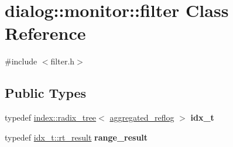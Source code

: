 \hypertarget{classdialog_1_1monitor_1_1filter}{}\section{dialog\+:\+:monitor\+:\+:filter Class Reference}
\label{classdialog_1_1monitor_1_1filter}


{\ttfamily \#include $<$filter.\+h$>$}

\subsection*{Public Types}
\begin{DoxyCompactItemize}
\item 
\mbox{\label{classdialog_1_1monitor_1_1filter_ab7625fee3176adc27d81874ef07e286c}} 
typedef \hyperlink{classdialog_1_1index_1_1radix__tree}{index\+::radix\+\_\+tree}$<$ \hyperlink{classdialog_1_1aggregated__reflog}{aggregated\+\_\+reflog} $>$ {\bfseries idx\+\_\+t}
\item 
\mbox{\label{classdialog_1_1monitor_1_1filter_a41a5af5773b4c0576171823801f6829c}} 
typedef \hyperlink{classflattened__container}{idx\+\_\+t\+::rt\+\_\+result} {\bfseries range\+\_\+result}
\end{DoxyCompactItemize}

